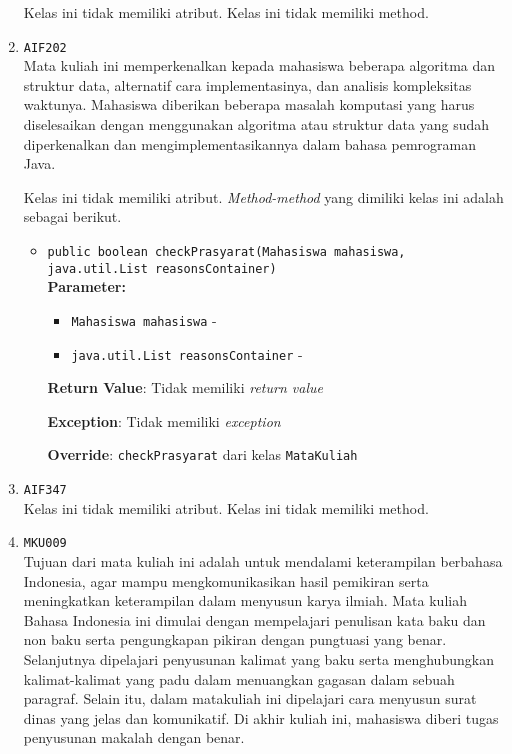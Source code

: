 \documentclass{article}
\begin{document}
\begin{enumerate}
Kelas ini tidak memiliki atribut. Kelas ini tidak memiliki method. \item \texttt{AIF202}\\ 
Mata kuliah ini memperkenalkan kepada mahasiswa beberapa algoritma dan 
 struktur data, alternatif cara implementasinya, dan analisis kompleksitas 
 waktunya. Mahasiswa diberikan beberapa masalah komputasi yang harus 
 diselesaikan dengan menggunakan algoritma atau struktur data yang sudah 
 diperkenalkan dan mengimplementasikannya dalam bahasa pemrograman Java.

Kelas ini tidak memiliki atribut. \textit{Method-method} yang dimiliki kelas ini adalah sebagai berikut.
\begin{itemize}
\item \texttt{public boolean checkPrasyarat(Mahasiswa mahasiswa, java.util.List reasonsContainer)}\\ 


\textbf{Parameter:}\begin{itemize}
\item \texttt{Mahasiswa mahasiswa} - 
\item \texttt{java.util.List reasonsContainer} - 
\end{itemize}
\textbf{Return Value}: Tidak memiliki \textit{return value}

\textbf{Exception}: Tidak memiliki \textit{exception}

\textbf{Override}: \texttt{checkPrasyarat} dari kelas \texttt{MataKuliah}

\end{itemize}
\item \texttt{AIF347}\\ 


Kelas ini tidak memiliki atribut. Kelas ini tidak memiliki method. \item \texttt{MKU009}\\ 
Tujuan dari mata kuliah ini adalah untuk mendalami keterampilan berbahasa Indonesia, agar 
 mampu mengkomunikasikan hasil pemikiran serta meningkatkan keterampilan dalam menyusun karya
 ilmiah. Mata kuliah Bahasa Indonesia ini dimulai dengan mempelajari penulisan kata baku dan 
 non baku serta pengungkapan pikiran dengan pungtuasi yang benar. Selanjutnya dipelajari 
 penyusunan kalimat yang baku serta menghubungkan kalimat-kalimat yang padu dalam menuangkan 
 gagasan dalam sebuah paragraf. Selain itu, dalam matakuliah ini dipelajari cara menyusun
 surat dinas yang jelas dan komunikatif. Di akhir kuliah ini, mahasiswa diberi tugas
 penyusunan makalah dengan benar.


\end{enumerate}
\end{document}

